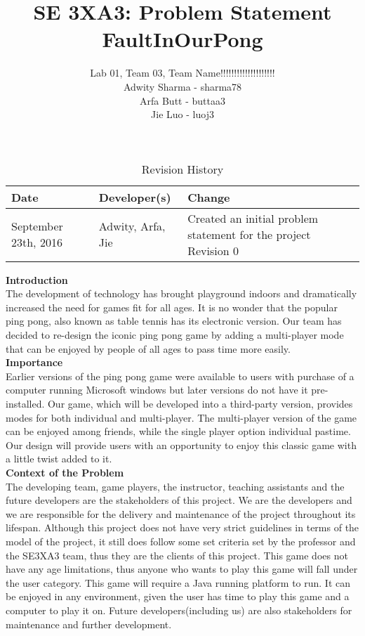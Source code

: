 \documentclass{article}
\title{SE 3XA3: Problem Statement\\FaultInOurPong}
\author{Lab 01, Team 03, Team Name!!!!!!!!!!!!!!!!!!!!
		\\ Adwity Sharma - sharma78
		\\ Arfa Butt - buttaa3
		\\ Jie Luo - luoj3
}
\date{}
\begin{document}
\begin{table}[hp]
\caption{Revision History} \label{TblRevisionHistory}
\begin{tabularx}{\textwidth}{llX}
\toprule
\textbf{Date} & \textbf{Developer(s)} & \textbf{Change}\\
\midrule
September 23th, 2016 & Adwity, Arfa, Jie & Created an initial problem statement for the project Revision 0\\
\bottomrule
\end{tabularx}
\end{table}

\newpage

\maketitle

\noindent\textbf{Introduction}\\

The development of technology has brought playground indoors and dramatically increased the need for games fit for all ages. It is no wonder that the popular ping pong, also known as table tennis has its electronic version. Our team has decided to re-design the iconic ping pong game by adding a multi-player mode that can be enjoyed by people of all ages to pass time more easily. \\

\noindent\textbf{Importance}\\

Earlier versions of the ping pong game were available to users with purchase of a computer running Microsoft windows but later versions do not have it pre-installed. Our game, which will be developed into a third-party version, provides modes for both individual and multi-player. The multi-player version of the game can be enjoyed among friends, while the single player option individual pastime. Our design will provide users with an opportunity to enjoy this classic game with a little twist added to it. \\

\noindent\textbf{Context of the Problem}\\

The developing team, game players, the instructor, teaching assistants and the future developers are the stakeholders of this project. We are the developers and we are responsible for the delivery and maintenance of the project throughout its lifespan. Although this project does not have very strict guidelines in terms of the model of the project, it still does follow some set criteria set by the professor and the SE3XA3 team, thus they are the clients of this project. This game does not have any age limitations, thus anyone who wants to play this game will fall under the user category. This game will require a Java running platform to run. It can be enjoyed in any environment, given the user has time to play this game and a computer to play it on. Future developers(including us) are also stakeholders for maintenance and further development.
\end{document}
